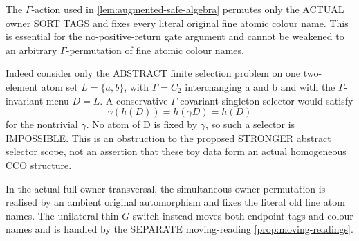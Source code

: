 \begin{remark}
\label{rem:augmented-safe-pure-gamma-essential}
The $\Gamma$-action used in
\cref{lem:augmented-safe-algebra}
permutes only the ACTUAL
owner SORT TAGS and fixes
every literal original
fine atomic colour name.
This is essential for the
no-positive-return gate
argument and cannot be
weakened to an arbitrary
$\Gamma$-permutation of
fine atomic colour names.

Indeed consider only the
ABSTRACT finite selection
problem on one
two-element atom set
$L=\{a,b\}$, with
$\Gamma=C_2$ interchanging
a and b and with the
$\Gamma$-invariant
menu $D=L$.
A conservative
$\Gamma$-covariant
singleton selector
would satisfy
\[
                  \gamma(h(D))
                    =h(\gamma D)=h(D)
\]
for the nontrivial
$\gamma$. No atom of D
is fixed by $\gamma$,
so such a selector is
IMPOSSIBLE. This is
an obstruction to the
proposed STRONGER
abstract selector scope,
not an assertion that
these toy data form
an actual homogeneous
CCO structure.

In the actual
full-owner transversal,
the simultaneous owner
permutation is realised
by an ambient original
automorphism and fixes
the literal old fine
atom names. The
unilateral thin-$G$
switch instead moves
both endpoint tags and
colour names and is
handled by the SEPARATE
moving-reading
\cref{prop:moving-readings}.
\end{remark}

